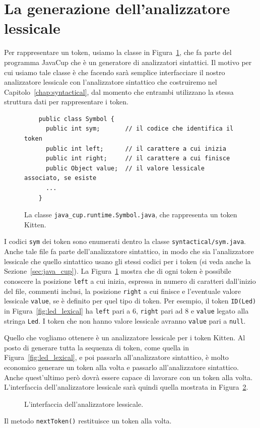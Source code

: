 \section{La generazione dell'analizzatore lessicale}\label{sec:jlex}
%
Per rappresentare un token, usiamo la classe in
Figura~\ref{fig:java_cup.runtime.Symbol}, che fa parte
del programma JavaCup che \`e un generatore di analizzatori
sintattici. Il motivo per cui usiamo tale classe \`e che \cosi
facendo sar\`a \piu semplice interfacciare il nostro analizzatore lessicale
con l'analizzatore sintattico che costruiremo nel
Capitolo~\ref{chap:syntactical}, dal momento
che entrambi utilizzano la stessa struttura dati per rappresentare i token.
%
\begin{figure}
\begin{verbatim}
    public class Symbol {
      public int sym;       // il codice che identifica il token
      public int left;      // il carattere a cui inizia
      public int right;     // il carattere a cui finisce
      public Object value;  // il valore lessicale associato, se esiste
      ...
    }
\end{verbatim}
\caption{La classe \texttt{java\_cup.runtime.Symbol.java}, che rappresenta
un token Kitten.}\label{fig:java_cup.runtime.Symbol}
\end{figure}
%
I codici \texttt{sym} dei token sono enumerati dentro la classe
\texttt{syntactical/sym.java}. Anche tale file fa parte dell'analizzatore sintattico,
in modo che sia l'analizzatore lessicale
che quello sintattico usano gli stessi codici per i token
(si veda anche la Sezione~\ref{sec:java_cup}).
La Figura~\ref{fig:java_cup.runtime.Symbol} mostra che di ogni token \`e
possibile conoscere la posizione \texttt{left} a cui inizia,
espressa in numero di caratteri dall'inizio del file, commenti inclusi,
la posizione \texttt{right} a cui finisce e l'eventuale
valore lessicale \texttt{value}, se \`e definito per quel tipo di token.
Per esempio, il token \texttt{ID(Led)} in
Figura~\ref{fig:led_lexical} ha \texttt{left} pari a $6$, \texttt{right} pari
ad $8$ e \texttt{value} legato alla stringa \texttt{Led}. I token
che non hanno valore lessicale avranno \texttt{value} pari a \texttt{null}.

Quello che vogliamo ottenere \`e un analizzatore lessicale per i token Kitten.
Al posto di generare tutta la sequenza di token, come quella in
Figura~\ref{fig:led_lexical}, e poi passarla all'analizzatore sintattico,
\`e molto \piu economico generare un token alla volta e passarlo
all'analizzatore sintattico. Anche quest'ultimo per\`o
dovr\`a essere capace di lavorare con un token alla volta.
L'interfaccia dell'analizzatore lessicale sar\`a quindi quella
mostrata in Figura~\ref{fig:lexer}.
%
\begin{figure}
\begin{center}
\end{center}
\caption{L'interfaccia dell'analizzatore lessicale.}\label{fig:lexer}
\end{figure}
%
Il metodo \texttt{nextToken()} restituisce un token alla volta.

